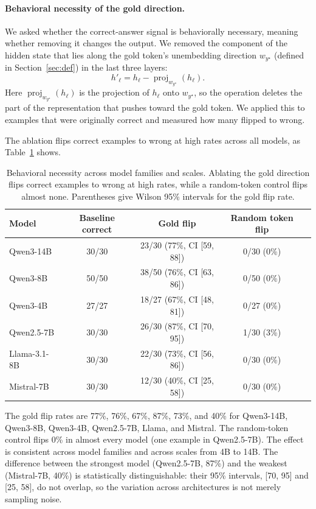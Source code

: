\documentclass{article} %
\begin{document}
\paragraph{Behavioral necessity of the gold direction.}
We asked whether the correct-answer signal is behaviorally necessary, meaning whether removing it changes the output. We removed the component of the hidden state that lies along the gold token's unembedding direction $w_{y^\star}$ (defined in Section~\ref{sec:def}) in the last three layers:
\begin{equation}
h'_\ell = h_\ell - \operatorname{proj}_{w_{y^\star}}(h_\ell) .
\end{equation}
Here $\operatorname{proj}_{w_{y^\star}}(h_\ell)$ is the projection of $h_\ell$ onto $w_{y^\star}$, so the operation deletes the part of the representation that pushes toward the gold token. We applied this to examples that were originally correct and measured how many flipped to wrong.

The ablation flips correct examples to wrong at high rates across all models, as Table~\ref{tab:ablation} shows.

\begin{table}[h]
\centering
\caption{Behavioral necessity across model families and scales. Ablating the gold direction flips correct examples to wrong at high rates, while a random-token control flips almost none. Parentheses give Wilson 95\% intervals for the gold flip rate.}
\label{tab:ablation}
\begin{tabular}{lcccc}
\toprule
\textbf{Model} & \textbf{Baseline correct} & \textbf{Gold flip} & \textbf{Random token flip} \\
\midrule
Qwen3-14B & 30/30 & 23/30 (77\%, CI [59, 88]) & 0/30 (0\%) \\
Qwen3-8B & 50/50 & 38/50 (76\%, CI [63, 86]) & 0/50 (0\%) \\
Qwen3-4B & 27/27 & 18/27 (67\%, CI [48, 81]) & 0/27 (0\%) \\
Qwen2.5-7B & 30/30 & 26/30 (87\%, CI [70, 95]) & 1/30 (3\%) \\
Llama-3.1-8B & 30/30 & 22/30 (73\%, CI [56, 86]) & 0/30 (0\%) \\
Mistral-7B & 30/30 & 12/30 (40\%, CI [25, 58]) & 0/30 (0\%) \\
\bottomrule
\end{tabular}
\end{table}

The gold flip rates are 77\%, 76\%, 67\%, 87\%, 73\%, and 40\% for Qwen3-14B, Qwen3-8B, Qwen3-4B, Qwen2.5-7B, Llama, and Mistral. The random-token control flips 0\% in almost every model (one example in Qwen2.5-7B). The effect is consistent across model families and across scales from 4B to 14B. The difference between the strongest model (Qwen2.5-7B, 87\%) and the weakest (Mistral-7B, 40\%) is statistically distinguishable: their 95\% intervals, [70, 95] and [25, 58], do not overlap, so the variation across architectures is not merely sampling noise.
\end{document}
